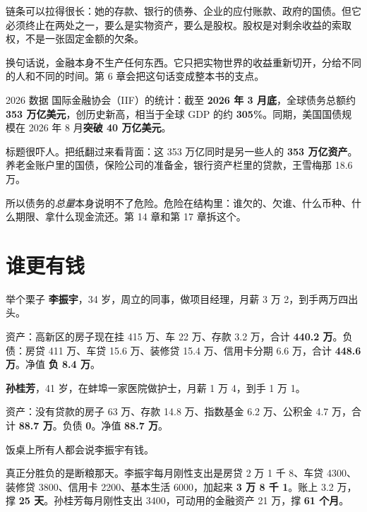 \begin{chainflow}
\chainarrow {}\chainarrow {}\chainarrow {}\chainarrow {}\chainarrow {}
\end{chainflow}

链条可以拉得很长：她的存款、银行的债券、企业的应付账款、政府的国债。但它必须终止在两处之一，要么是实物资产，要么是股权。股权是对剩余收益的索取权，不是一张固定金额的欠条。

换句话说，金融本身不生产任何东西。它只把实物世界的收益重新切开，分给不同的人和不同的时间。第 6 章会把这句话变成整本书的支点。

\begin{databox}{2026 数据}
国际金融协会（IIF）的统计：截至 \textbf{2026 年 3 月底}，全球债务总额约 \textbf{353 万亿美元}，创历史新高，相当于全球 GDP 的约 \textbf{305\%}。同期，美国国债规模在 2026 年 8 月\textbf{突破 40 万亿美元}。

标题很吓人。把纸翻过来看背面：这 353 万亿同时是另一些人的 \textbf{353 万亿资产}。养老金账户里的国债，保险公司的准备金，银行资产栏里的贷款，王雪梅那 18.6 万。

所以债务的\emph{总量}本身说明不了危险。危险在结构里：谁欠的、欠谁、什么币种、什么期限、拿什么现金流还。第 14 章和第 17 章拆这个。

\end{databox}

\section{谁更有钱}

\begin{egbox}{举个栗子}
\textbf{李振宇}，34 岁，周立的同事，做项目经理，月薪 3 万 2，到手两万四出头。

资产：高新区的房子现在挂 415 万、车 22 万、存款 3.2 万，合计 \textbf{440.2 万}。负债：房贷 411 万、车贷 15.6 万、装修贷 15.4 万、信用卡分期 6.6 万，合计 \textbf{448.6 万}。净值 \textbf{负 8.4 万}。

\textbf{孙桂芳}，41 岁，在蚌埠一家医院做护士，月薪 1 万 4，到手 1 万 1。

资产：没有贷款的房子 63 万、存款 14.8 万、指数基金 6.2 万、公积金 4.7 万，合计 \textbf{88.7 万}。负债 \textbf{0}。净值 \textbf{88.7 万}。

饭桌上所有人都会说李振宇有钱。

真正分胜负的是断粮那天。李振宇每月刚性支出是房贷 2 万 1 千 8、车贷 4300、装修贷 3800、信用卡 2200、基本生活 6000，加起来 \textbf{3 万 8 千 1}。账上 3.2 万，撑 \textbf{25 天}。孙桂芳每月刚性支出 3400，可动用的金融资产 21 万，撑 \textbf{61 个月}。

\end{egbox}

